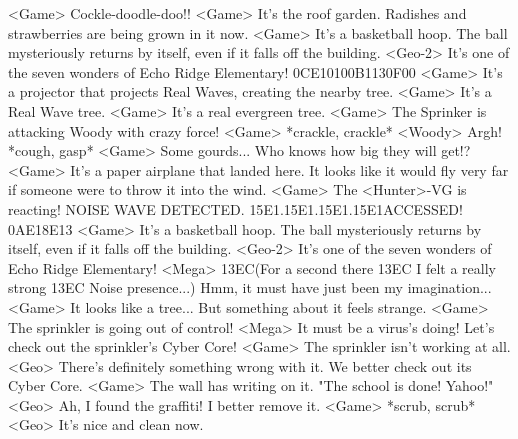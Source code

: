 <Game> Cockle-doodle-doo!! 
<Game> It's the roof garden. 
Radishes and strawberries are being grown in it now. 
<Game> It's a basketball hoop. 
The ball mysteriously returns by itself, even if it falls off the building. 
<Geo-2> It's one of the seven wonders of Echo Ridge Elementary! 
{0C}{E1}{01}{00}{B1}{13}{0F}{00}
<Game> It's a projector that projects Real Waves, creating the nearby tree. 
<Game> It's a Real Wave tree. 
<Game> It's a real evergreen tree. 
<Game> The Sprinker is attacking Woody with crazy force! 
<Game> *crackle, crackle* 
<Woody> Argh! *cough, gasp* 
<Game> Some gourds... 
Who knows how big they will get!? 
<Game> It's a paper airplane that landed here. 
It looks like it would fly very far if someone were to throw it into the wind. 
<Game> The <Hunter>-VG is reacting! 
NOISE WAVE DETECTED. {15}{E1}.{15}{E1}.{15}{E1}.{15}{E1}ACCESSED! 
{0A}{E1}{8E}{13}
<Game> It's a basketball hoop. 
The ball mysteriously returns by itself, even if it falls off the building. 
<Geo-2> It's one of the seven wonders of Echo Ridge Elementary! 
<Mega> {13}{EC}(For a second there {13}{EC} I felt a really strong {13}{EC} Noise presence...) 
Hmm, it must have just been my imagination... 
<Game> It looks like a tree... But something about it feels strange. 
<Game> The sprinkler is going out of control! 
<Mega> It must be a virus's doing! Let's check out the sprinkler's Cyber Core! 
<Game> The sprinkler isn't working at all. 
<Geo> There's definitely something wrong with it. We better check out its Cyber Core. 
<Game> The wall has writing on it. "The school is done! Yahoo!" 
<Geo> Ah, I found the graffiti! I better remove it. 
<Game> *scrub, scrub* 
<Geo> It's nice and clean now. 
